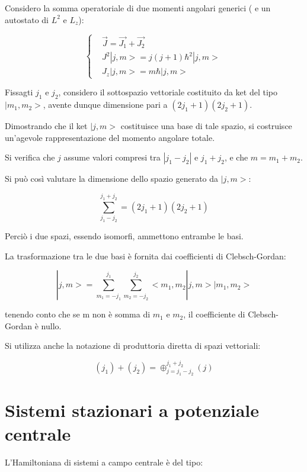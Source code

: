 \documentclass{article}
\begin{document}
Considero la somma operatoriale di due momenti angolari generici ( e un autostato di $L^2$ e $L_z$):

\begin{equation}
    \left\{
    \begin{aligned}
         & \vec{J}=\vec{J_1}+\vec{J_2} \\
         & J^2|j,m>=j(j+1)\hbar^2|j,m> \\
         & J_z|j,m>=m\hbar|j,m>
    \end{aligned}
    \right.
\end{equation}

Fissagti $j_1$ e $j_2$, considero il sottospazio vettoriale costituito da ket del tipo $|m_1,m_2>$, avente dunque dimensione pari a $(2j_1+1)(2j_2+1)$.

Dimostrando che il ket $|j,m>$ costituisce una base di tale spazio, si costruisce un'agevole rappresentazione del momento angolare totale.

Si verifica che $j$ assume valori compresi tra $|j_1-j_2|$ e $j_1+j_2$, e che $m=m_1+m_2$.

Si può così valutare la dimensione dello spazio generato da $|j,m>$:

\begin{equation}
    \sum_{j_1-j_2}^{j_1+j_2}=(2j_1+1)(2j_2+1)
\end{equation}

Perciò i due spazi, essendo isomorfi, ammettono entrambe le basi.

La trasformazione tra le due basi è fornita dai coefficienti di Clebsch-Gordan:

\begin{equation}
    |j,m>=\sum_{m_1=-j_1}^{j_1} \sum_{m_2=-j_2}^{j_2}<m_1,m_2|j,m>|m_1,m_2>
\end{equation}

tenendo conto che se m non è somma di $m_1$ e $m_2$, il coefficiente di Clebsch-Gordan è nullo.

Si utilizza anche la notazione di produttoria diretta di spazi vettoriali:

\begin{equation}
    (j_1)+(j_2)= \oplus_{j=j_1-j_2}^{j_1+j_2} (j)
\end{equation}

\section{Sistemi stazionari a potenziale centrale}
L'Hamiltoniana di sistemi a campo centrale è del tipo:
\end{document}
